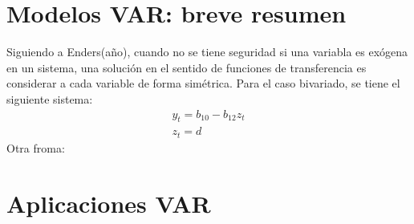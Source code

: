 \documentclass{article}
\begin{document}
\section{Modelos VAR: breve resumen}
Siguiendo a Enders(año), cuando no se tiene seguridad si una variabla es exógena en un sistema, 
una solución en el sentido de funciones de transferencia es considerar a cada variable de forma simétrica.
Para el caso bivariado, se tiene el siguiente sistema:
\begin{eqnarray}
    y_{t}=b_{10}-b_{12}z_t \\
    z_{t}=d
\end{eqnarray}
Otra froma: 


\section{Aplicaciones VAR}

\end{document}
